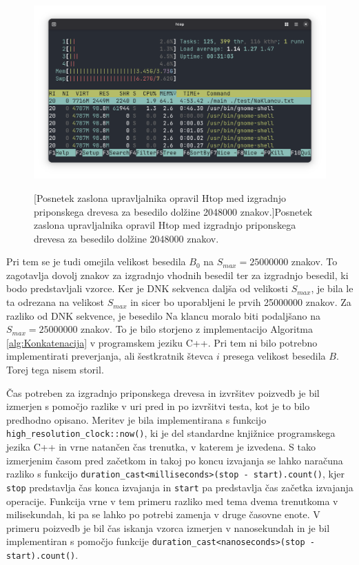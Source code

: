 \begin{figure}[tb]
    \centering
    \includegraphics[width=\textwidth]{Slike/Zaslonski posnetek 2025-06-23 22-53-56.png}

    [Posnetek zaslona upravljalnika opravil Htop med izgradnjo priponskega drevesa za besedilo dolžine 2048000 znakov.]{Posnetek zaslona upravljalnika opravil Htop med izgradnjo priponskega drevesa za besedilo dolžine 2048000 znakov.} 
    \label{fig:6GB}
\end{figure}

\newpage
Pri tem se je tudi omejila velikost besedila $B_0$ na $S_{max}=25000000$ znakov. To zagotavlja dovolj znakov za izgradnjo vhodnih besedil ter za izgradnjo besedil, ki bodo predstavljali vzorce. Ker je DNK sekvenca \cite{podatki} daljša od velikosti $S_{max}$, je bila le ta odrezana na velikost $S_{max}$ in sicer bo uporabljeni le prvih 25000000 znakov. Za razliko od DNK sekvence, je besedilo Na klancu \cite{podatkiNaKlancu} moralo biti podaljšano na $S_{max}=25000000$ znakov. To je bilo storjeno z implementacijo Algoritma \ref{alg:Konkatenacija} v programskem jeziku C++. Pri tem ni bilo potrebno implementirati preverjanja, ali šestkratnik števca $i$ presega velikost besedila $B$. Torej tega nisem storil.

Čas potreben za izgradnjo priponskega drevesa in izvršitev poizvedb je bil izmerjen s pomočjo razlike v uri pred in po izvršitvi testa, kot je to bilo predhodno opisano. Meritev je bila implementirana s funkcijo \verb|high_resolution_clock::now()|, ki je del standardne knjižnice programskega jezika C++ in vrne natančen čas trenutka, v katerem je izvedena.
S tako izmerjenim časom pred začetkom in takoj po koncu izvajanja se lahko naračuna razliko s funkcijo \verb|duration_cast<milliseconds>(stop - start).count()|, kjer \verb|stop| predstavlja čas konca izvajanja in \verb|start| pa predstavlja čas začetka izvajanja operacije. Funkcija vrne v tem primeru razliko med tema dvema trenutkoma v milisekundah, ki pa se lahko po potrebi zamenja v druge časovne enote. V primeru poizvedb je bil čas iskanja vzorca izmerjen v nanosekundah in je bil implementiran s pomočjo funkcije \verb|duration_cast<nanoseconds>(stop - start).count()|.

